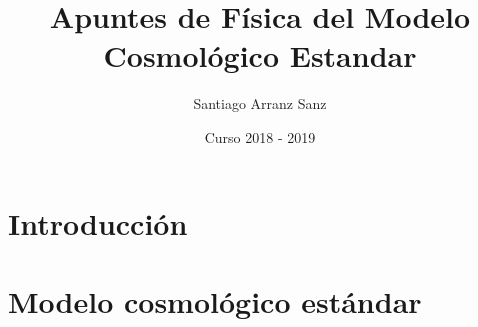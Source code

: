 \documentclass{book}
\title{Apuntes de Física del Modelo Cosmológico Estandar}
\author{Santiago Arranz Sanz}
\date{Curso 2018 - 2019}
\begin{document}
%
\begin{titlepage}
  \maketitle
\end{titlepage}
\tableofcontents
{}
\setcounter{page}{5}
\chapter*{Introducción}


\chapter{Modelo cosmológico estándar}



 
 

\end{document}
